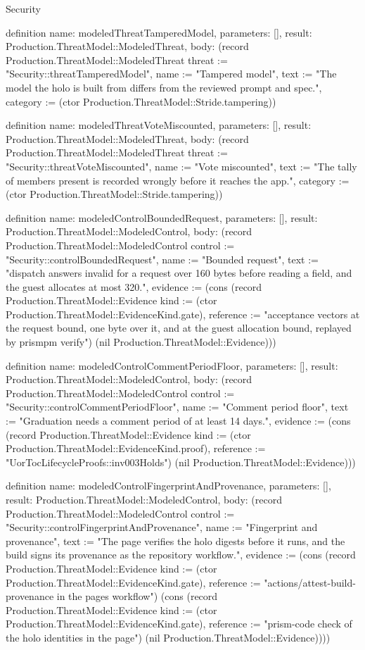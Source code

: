 \begin{lexlean}{Security}
\begin{semanticmodule}
definition{
  name: modeledThreatTamperedModel,
  parameters: [],
  result: Production.ThreatModel::ModeledThreat,
  body: (record Production.ThreatModel::ModeledThreat {threat := "Security::threatTamperedModel", name := "Tampered model", text := "The model the holo is built from differs from the reviewed prompt and spec.", category := (ctor Production.ThreatModel::Stride.tampering)})
}

definition{
  name: modeledThreatVoteMiscounted,
  parameters: [],
  result: Production.ThreatModel::ModeledThreat,
  body: (record Production.ThreatModel::ModeledThreat {threat := "Security::threatVoteMiscounted", name := "Vote miscounted", text := "The tally of members present is recorded wrongly before it reaches the app.", category := (ctor Production.ThreatModel::Stride.tampering)})
}

definition{
  name: modeledControlBoundedRequest,
  parameters: [],
  result: Production.ThreatModel::ModeledControl,
  body: (record Production.ThreatModel::ModeledControl {control := "Security::controlBoundedRequest", name := "Bounded request", text := "dispatch answers invalid for a request over 160 bytes before reading a field, and the guest allocates at most 320.", evidence := (cons (record Production.ThreatModel::Evidence {kind := (ctor Production.ThreatModel::EvidenceKind.gate), reference := "acceptance vectors at the request bound, one byte over it, and at the guest allocation bound, replayed by prismpm verify"}) (nil Production.ThreatModel::Evidence))})
}

definition{
  name: modeledControlCommentPeriodFloor,
  parameters: [],
  result: Production.ThreatModel::ModeledControl,
  body: (record Production.ThreatModel::ModeledControl {control := "Security::controlCommentPeriodFloor", name := "Comment period floor", text := "Graduation needs a comment period of at least 14 days.", evidence := (cons (record Production.ThreatModel::Evidence {kind := (ctor Production.ThreatModel::EvidenceKind.proof), reference := "UorTocLifecycleProofs::inv003Holds"}) (nil Production.ThreatModel::Evidence))})
}

definition{
  name: modeledControlFingerprintAndProvenance,
  parameters: [],
  result: Production.ThreatModel::ModeledControl,
  body: (record Production.ThreatModel::ModeledControl {control := "Security::controlFingerprintAndProvenance", name := "Fingerprint and provenance", text := "The page verifies the holo digests before it runs, and the build signs its provenance as the repository workflow.", evidence := (cons (record Production.ThreatModel::Evidence {kind := (ctor Production.ThreatModel::EvidenceKind.gate), reference := "actions/attest-build-provenance in the pages workflow"}) (cons (record Production.ThreatModel::Evidence {kind := (ctor Production.ThreatModel::EvidenceKind.gate), reference := "prism-code check of the holo identities in the page"}) (nil Production.ThreatModel::Evidence)))})
}


\end{semanticmodule}
\end{lexlean}
